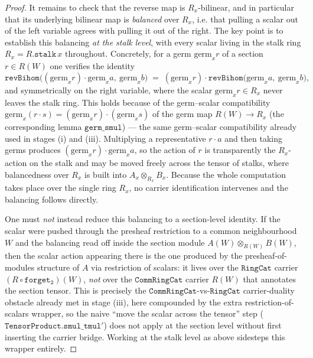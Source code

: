 \begin{proof}
  It remains to check that the reverse map is \(R_x\)-bilinear, and in particular that
  its underlying bilinear map is \emph{balanced} over \(R_x\), i.e. that pulling a scalar
  out of the left variable agrees with pulling it out of the right. The key point is to
  establish this balancing \emph{at the stalk level}, with every scalar living in the
  stalk ring \(R_x = R.\mathtt{stalk}\,x\) throughout. Concretely, for a germ
  \(\mathrm{germ}_x r\) of a section \(r \in R(W)\) one verifies the identity
  \[
    \mathtt{revBihom}\bigl((\mathrm{germ}_x r)\cdot \mathrm{germ}_x a,\ \mathrm{germ}_x b\bigr)
      \;=\; (\mathrm{germ}_x r)\cdot \mathtt{revBihom}\bigl(\mathrm{germ}_x a,\ \mathrm{germ}_x b\bigr),
  \]
  and symmetrically on the right variable, where the scalar \(\mathrm{germ}_x r \in R_x\)
  never leaves the stalk ring. This holds because of the germ--scalar compatibility
  \(\mathrm{germ}_x(r \cdot s) = (\mathrm{germ}_x r)\cdot(\mathrm{germ}_x s)\) of the germ
  map \(R(W) \to R_x\) (the corresponding lemma \(\mathtt{germ\_smul}\)) — the same germ--scalar
  compatibility already used in stages (i) and (iii). Multiplying a representative
  \(r \cdot a\) and then taking germs produces \((\mathrm{germ}_x r)\cdot \mathrm{germ}_x a\),
  so the action of \(r\) is transparently the \(R_x\)-action on the stalk and may be
  moved freely across the tensor of stalks, where balancedness over \(R_x\) is built into
  \(A_x \otimes_{R_x} B_x\). Because the whole computation takes place over the single
  ring \(R_x\), no carrier identification intervenes and the balancing follows directly.

  One must \emph{not} instead reduce this balancing to a section-level identity. If the
  scalar were pushed through the presheaf restriction to a common neighbourhood \(W\) and
  the balancing read off inside the section module \(A(W) \otimes_{R(W)} B(W)\), then the
  scalar action appearing there is the one produced by the presheaf-of-modules structure
  of \(A\) via restriction of scalars: it lives over the \(\mathtt{RingCat}\) carrier
  \((R \circ \mathtt{forget_2})(W)\), \emph{not} over the \(\mathtt{CommRingCat}\) carrier
  \(R(W)\) that annotates the section tensor. This is precisely the
  \(\mathtt{CommRingCat}\)-vs-\(\mathtt{RingCat}\) carrier-duality obstacle already met in
  stage (iii), here compounded by the extra restriction-of-scalars wrapper, so the naive
  ``move the scalar across the tensor'' step (\(\mathtt{TensorProduct.smul\_tmul'}\)) does
  not apply at the section level without first inserting the carrier bridge. Working at the
  stalk level as above sidesteps this wrapper entirely.


\end{proof}
